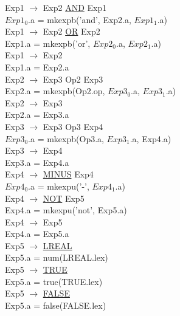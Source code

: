 \documentclass[\main/MemoriaPL.tex]{subfiles}
\begin{document}
    Exp1 $\rightarrow$ Exp2 \underline{AND} Exp1\\
    \hspace*{5mm}$Exp1_0$.a = mkexpb('and', Exp2.a, $Exp1_1$.a)\\
    Exp1 $\rightarrow$ Exp2 \underline{OR} Exp2\\
    \hspace*{5mm}Exp1.a = mkexpb('or', $Exp2_0$.a, $Exp2_1$.a)\\
    Exp1 $\rightarrow$ Exp2\\
    \hspace*{5mm}Exp1.a = Exp2.a\\
    Exp2 $\rightarrow$ Exp3 Op2 Exp3\\
    \hspace*{5mm}Exp2.a = mkexpb(Op2.op, $Exp3_0$.a, $Exp3_1$.a)\\
    Exp2 $\rightarrow$ Exp3\\
    \hspace*{5mm}Exp2.a = Exp3.a\\
    Exp3 $\rightarrow$ Exp3 Op3 Exp4\\
    \hspace*{5mm}$Exp3_0$.a = mkexpb(Op3.a, $Exp3_1$.a, Exp4.a)\\
    Exp3 $\rightarrow$ Exp4\\
    \hspace*{5mm}Exp3.a = Exp4.a\\
    Exp4 $\rightarrow$ \underline{MINUS} Exp4\\
    \hspace*{5mm}$Exp4_0$.a = mkexpu('-', $Exp4_1$.a)\\
    Exp4 $\rightarrow$ \underline{NOT} Exp5\\
    \hspace*{5mm}Exp4.a = mkexpu('not', Exp5.a)\\
    Exp4 $\rightarrow$ Exp5\\
    \hspace*{5mm}Exp4.a = Exp5.a\\
    Exp5 $\rightarrow$ \underline{LREAL}\\
    \hspace*{5mm}Exp5.a = num(LREAL.lex)\\
    Exp5 $\rightarrow$ \underline{TRUE}\\
    \hspace*{5mm}Exp5.a = true(TRUE.lex)\\
    Exp5 $\rightarrow$ \underline{FALSE}\\
    \hspace*{5mm}Exp5.a = false(FALSE.lex)\\
\end{document}
